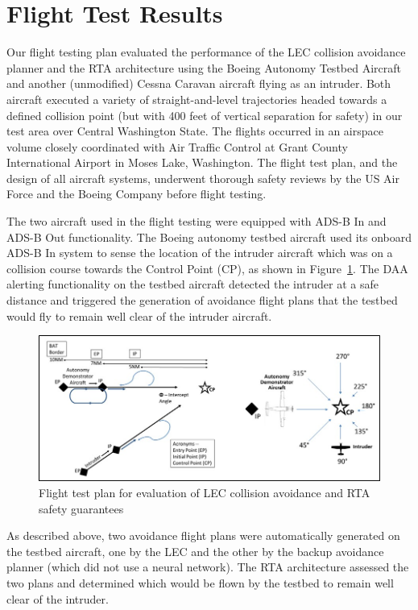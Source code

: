 \section{Flight Test Results}

Our flight testing plan evaluated the performance of the LEC collision avoidance planner and the RTA architecture using the Boeing Autonomy Testbed Aircraft and another (unmodified) Cessna Caravan aircraft flying as an intruder.  Both aircraft executed a variety of straight-and-level trajectories headed towards a defined collision point (but with 400 feet of vertical separation for safety) in our test area over Central Washington State.  The flights occurred in an airspace volume closely coordinated with Air Traffic Control at Grant County International Airport in Moses Lake, Washington.  The flight test plan, and the design of all aircraft systems, underwent thorough safety reviews by the US Air Force and the Boeing Company before flight testing.

The two aircraft used in the flight testing were equipped with ADS-B In and ADS-B Out functionality.  The Boeing autonomy testbed aircraft used its onboard ADS-B In system to sense the location of the intruder aircraft which was on a collision course towards the Control Point (CP), as shown in Figure~\ref{fig:flight-test}.  The DAA alerting functionality on the testbed aircraft detected the intruder at a safe distance and triggered the generation of avoidance flight plans that the testbed would fly to remain well clear of the intruder aircraft.  

\begin{figure}
	\centering
	\includegraphics[width=\textwidth]{figures/flight-test.jpg}
	\caption{Flight test plan for evaluation of LEC collision avoidance and RTA safety guarantees}
	\label{fig:flight-test}
\end{figure}

As described above, two avoidance flight plans were automatically generated on the testbed aircraft, one by the LEC and the other by the backup avoidance planner (which did not use a neural network).
The RTA architecture assessed the two plans and determined which would be flown by the testbed to remain well clear of the intruder.

